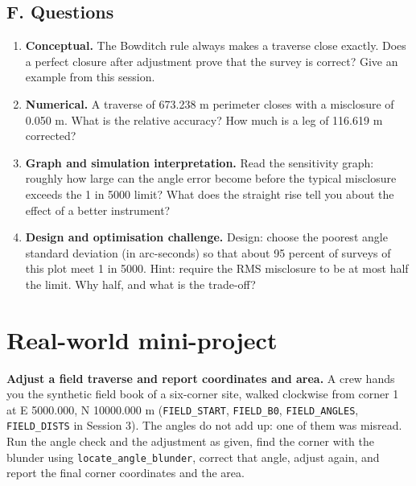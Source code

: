 \documentclass[11pt,a4paper]{article}
\begin{document}
\subsection*{F. Questions}
\begin{enumerate}[nosep]
\item \textbf{Conceptual.} The Bowditch rule always makes a traverse close exactly. Does a perfect closure after adjustment prove that the survey is correct? Give an example from this session.
\item \textbf{Numerical.} A traverse of 673.238 m perimeter closes with a misclosure of 0.050 m. What is the relative accuracy? How much is a leg of 116.619 m corrected?
\item \textbf{Graph and simulation interpretation.} Read the sensitivity graph: roughly how large can the angle error become before the typical misclosure exceeds the 1 in 5000 limit? What does the straight rise tell you about the effect of a better instrument?
\item \textbf{Design and optimisation challenge.} Design: choose the poorest angle standard deviation (in arc-seconds) so that about 95 percent of surveys of this plot meet 1 in 5000. Hint: require the RMS misclosure to be at most half the limit. Why half, and what is the trade-off?
\end{enumerate}

\section{Real-world mini-project}
\textbf{Adjust a field traverse and report coordinates and area.} A crew hands you the synthetic field book of a six-corner site, walked clockwise from corner 1 at E 5000.000, N 10000.000 m (\texttt{FIELD\_START}, \texttt{FIELD\_B0}, \texttt{FIELD\_ANGLES}, \texttt{FIELD\_DISTS} in Session 3). The angles do not add up: one of them was misread. Run the angle check and the adjustment as given, find the corner with the blunder using \texttt{locate\_angle\_blunder}, correct that angle, adjust again, and report the final corner coordinates and the area.
\end{document}
